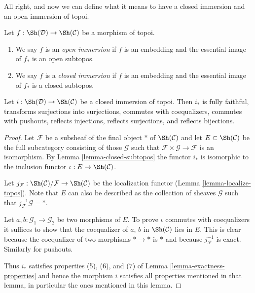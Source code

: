 \noindent
All right, and now we can define what it means to have a closed immersion
and an open immersion of topoi.

\begin{definition}
\label{definition-immersion-topoi}
Let $f : \Sh(\mathcal{D}) \to \Sh(\mathcal{C})$ be a morphism of topoi.
\begin{enumerate}
\item We say $f$ is an {\it open immersion} if $f$ is an embedding
and the essential image of $f_*$ is an open subtopos.
\item We say $f$ is a {\it closed immersion} if $f$ is an embedding
and the essential image of $f_*$ is a closed subtopos.
\end{enumerate}
\end{definition}

\begin{lemma}
\label{lemma-closed-immersion}
Let $i : \Sh(\mathcal{D}) \to \Sh(\mathcal{C})$ be a closed immersion of
topoi. Then $i_*$ is fully faithful, transforms surjections into surjections,
commutes with coequalizers, commutes with pushouts, reflects injections,
reflects surjections, and reflects bijections.
\end{lemma}

\begin{proof}
Let $\mathcal{F}$ be a subsheaf of the final object $*$ of $\Sh(\mathcal{C})$
and let $E \subset \Sh(\mathcal{C})$ be the full subcategory consisting
of those $\mathcal{G}$ such that
$\mathcal{F} \times \mathcal{G} \to \mathcal{F}$ is an isomorphism.
By Lemma \ref{lemma-closed-subtopos}
the functor $i_*$ is isomorphic to the
inclusion functor $\iota : E \to \Sh(\mathcal{C})$.

\medskip\noindent
Let $j_{\mathcal{F}} : \Sh(\mathcal{C})/\mathcal{F} \to \Sh(\mathcal{C})$
be the localization functor (Lemma \ref{lemma-localize-topos}).
Note that $E$ can also be described as
the collection of sheaves $\mathcal{G}$ such that
$j_\mathcal{F}^{-1}\mathcal{G} = *$.

\medskip\noindent
Let $a, b : \mathcal{G}_1 \to \mathcal{G}_2$ be two morphisms of $E$.
To prove $\iota$ commutes with coequalizers it suffices to show that
the coequalizer of $a$, $b$ in $\Sh(\mathcal{C})$ lies in $E$.
This is clear because
the coequalizer of two morphisms $* \to *$ is $*$ and because
$j_\mathcal{F}^{-1}$ is exact. Similarly for pushouts.

\medskip\noindent
Thus $i_*$ satisfies properties (5), (6), and (7) of
Lemma \ref{lemma-exactness-properties} and hence
the morphism $i$ satisfies all properties mentioned in that
lemma, in particular the ones mentioned in this lemma.
\end{proof}








